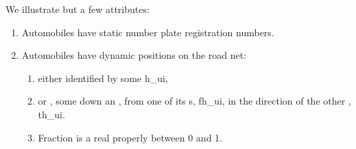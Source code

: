 {\vspace*{1mm}
\mnewfoil

\noindent
{}
\begynd
\pind We illustrate but a few attributes:
\afslut
\begin{enumerate}\setei
\item \label{a-attr-000} Automobiles have static number plate
                         registration numbers.
\item \label{a-attr-005} Automobiles have dynamic positions on the road net:
\begin{enumerate}
\item\label{a-attr-005a} either  identified by some \textsf{h\_ui}, 
\item\label{a-attr-005b} or , some  down an
                         , from one of
                         its s, \textsf{fh\_ui}, in the 
                         direction of the other ,
                         \textsf{th\_ui}. 
\item\label{a-attr-005c} Fraction is a real properly between 0 and 1.
\end{enumerate}
\savei\end{enumerate}\footsize
\mnewfoil

}
